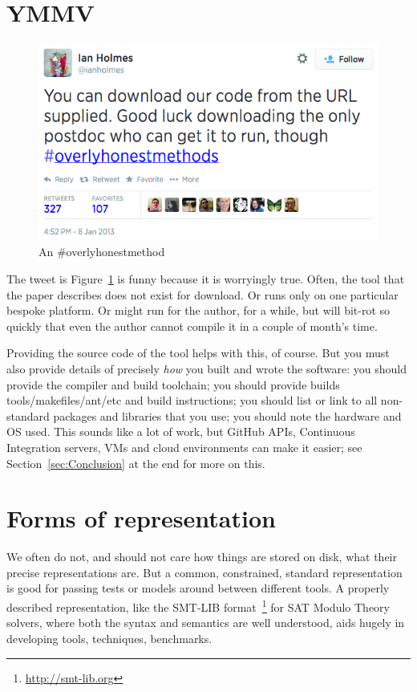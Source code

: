 \documentclass[conference]{IEEEtran}
\begin{document}
\section{YMMV}

\begin{figure}[!ht]
\centering
\includegraphics[width=0.9\columnwidth]{overlyhonesttweet.png}
\caption{An \#overlyhonestmethod}
\label{fig:overlyhonestmethod} 
\end{figure}

The tweet is Figure~\ref{fig:overlyhonestmethod} is funny because it
is worryingly true. Often, the tool that the paper describes does not
exist for download. Or runs only on one particular bespoke
platform. Or might run for the author, for a while, but will bit-rot
so quickly that even the author cannot compile it in a couple of
month's time.

Providing the source code of the tool helps with this, of course. But
you must also provide details of precisely \emph{how} you built and
wrote the software:
%
you should provide the compiler and build toolchain; 
%
you should provide builds tools/makefiles/ant/etc and build instructions; 
%
you should list or link to all non-standard packages and libraries that you use; 
%
you should note the hardware and OS used. 
%
This sounds like a lot of work, but GitHub APIs, Continuous
Integration servers, VMs and cloud environments can make it easier; see
Section~\ref{sec:Conclusion} at the end for more on this.


\section{Forms of representation}

We often do not, and should not care how things are stored on disk,
what their precise representations are. But a common, constrained, standard
representation is good for passing tests or models around between
different tools. A properly described representation, like the SMT-LIB
format~\footnote{\url{http://smt-lib.org}} for SAT Modulo Theory
solvers, where both the syntax and semantics are well understood, aids
hugely in developing tools, techniques, benchmarks.
\end{document}
